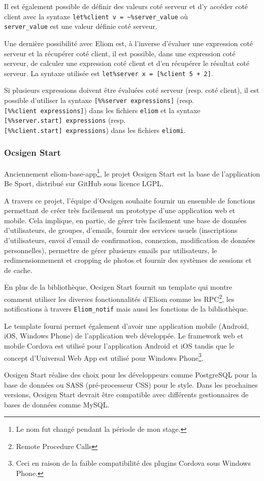 Il est également possible de définir des valeurs coté serveur et d'y accéder
coté client avec la syntaxe \verb|let%client v = ~%server_value| où \\
\verb|server_value| est une valeur définie coté serveur.

Une dernière possibilité avec Eliom est, à l'inverse d'évaluer une expression
coté serveur et la récupérer coté client, il est possible, dans une expression
coté serveur, de calculer une expression coté client et d'en récupérer le
résultat coté serveur.
La syntaxe utilisée est \verb|let%server x = [%client 5 + 2]|.

Si plusieurs expressions doivent être évaluées coté serveur (resp. coté client),
il est possible d'utiliser la syntaxe \verb|[%%server expressions]| (resp. \\
\verb|[%%client expressions]|) dans les fichiers \verb|eliom| et la syntaxe \\
\verb|[%%server.start] expressions| (resp. \\ \verb|[%%client.start] expressions|)
dans les fichiers \verb|eliomi|.

\subsubsection{Ocsigen Start}

Anciennement eliom-base-app\footnote{Le nom fut changé pendant la période de
  mon stage.}, le projet Ocsigen Start\cite{ocsigen-start-github} est la base de
l'application Be Sport, distribué sur GitHub sous licence LGPL.

A travers ce projet, l'équipe d'Ocsigen souhaite fournir un ensemble de
fonctions permettant de créer très facilement un prototype d'une application web
et mobile. Cela implique, en partie, de gérer très facilement une base de
données d'utilisateurs, de groupes, d'emails, fournir des services usuels
(inscriptions d'utilisateurs, envoi d'email de confirmation, connexion,
modification de données personnelles), permettre de gérer plusieurs emails par
utilisateurs, le redimensionnement et cropping de photos et fournir des systèmes
de sessions et de cache.

En plus de la bibliothèque, Ocsigen Start fournit un template qui montre
comment utiliser les diverses fonctionnalités d'Eliom comme les
RPC\footnote{Remote Procedure Calls}, les notifications à travers
\verb|Eliom_notif| mais aussi les fonctions de la bibliothèque.

Le template fourni permet également d'avoir une application mobile (Android,
iOS, Windows Phone) de l'application web développée. Le framework web et mobile
Cordova est utilisé pour l'application Android et iOS tandis que le concept
d'Universal Web App est utilisé pour Windows Phone\footnote{Ceci en raison de
  la faible compatibilité des plugins Cordova sous Windows Phone.}.

Ocsigen Start réalise des choix pour les développeurs comme PostgreSQL pour la
base de données ou SASS (pré-processeur CSS) pour le style.
Dans les prochaines versions, Ocsigen Start devrait être compatible avec
différents gestionnaires de bases de données comme MySQL.